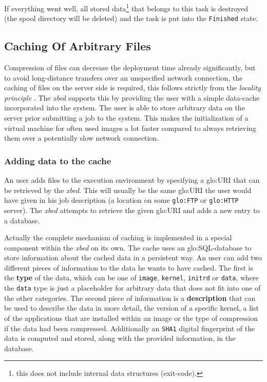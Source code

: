 If everything  went well, all  stored data\footnote{this does  not include
  internal data structures (\eg exit-code).}  that belongs to this task is
destroyed (\ie  the spool directory will  be deleted) and the  task is put
into the \texttt{Finished} state.

\subsection{Caching Of Arbitrary Files}
\label{sec:caching}

Compression   of  files   can   decrease  the   deployment  time   already
significantly, but  to avoid  long-distance transfers over  an unspecified
network connection, the  caching of files on the  server side is required,
this    follows    strictly    from    the    \emph{locality    principle}
\cite{locality-principle}.  The \emph{xbed} supports this by providing the
user with a  simple data-cache incorporated into the  system.  The user is
able to store  arbitrary data on the server prior submitting  a job to the
system. This makes the initialization  of a virtual machine for often used
images a lot faster compared  to always retrieving them over a potentially
slow network connection.

\subsubsection{Adding data to the cache}

An  user  adds  files  to   the  execution  environment  by  specifying  a
\gls{glo:URI} that can be retrieved by the \emph{xbed}.  This will usually
be the same \gls{glo:URI} the user would have given in his job description
(\eg a location  on some \texttt{\gls{glo:FTP}} or \texttt{\gls{glo:HTTP}}
server).  The \emph{xbed} attempts to retrieve the given \gls{glo:URI} and
adds a new entry to a database.

Actually the  complete mechanism  of caching is  implemented in  a special
component  within  the  \emph{xbed}  on   its  own.   The  cache  uses  an
\gls{glo:SQL}-database  to store information  about the  cached data  in a
persistent way. An user can add two different pieces of information to the
data he wants to have cached.  The first is the \textbf{type} of the data,
which can  be one  of \texttt{image}, \texttt{kernel},  \texttt{initrd} or
\texttt{data},  where the  \texttt{data} type  is just  a  placeholder for
arbitrary data  that does not fit  into one of the  other categories.  The
second piece of information is  a \textbf{description} that can be used to
describe the data in more detail,  \eg the version of a specific kernel, a
list of the applications that are installed within an image or the type of
compression   if  the   data   had  been   compressed.   Additionally   an
\texttt{SHA1}  digital fingerprint  of the  data is  computed  and stored,
along with the provided information, in the database.

